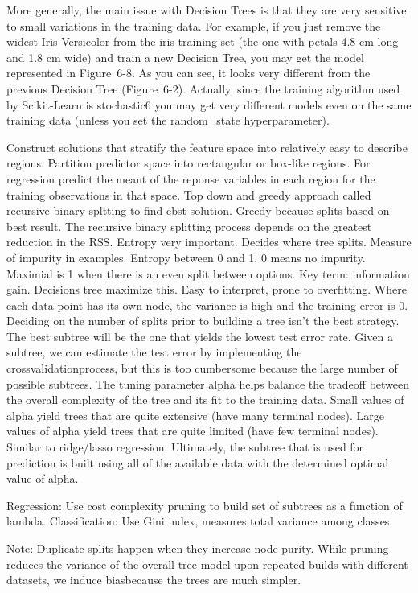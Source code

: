 \documentclass[]{book}
\begin{document}
More generally, the main issue with Decision Trees is that they are very sensitive to small variations in the training data. For example, if you just remove the widest Iris-Versicolor from the iris training set (the one with petals 4.8 cm long and 1.8 cm wide) and train a new Decision Tree, you may get the model represented in Figure~6-8. As you can see, it looks very different from the previous Decision Tree (Figure~6-2). Actually, since the training algorithm used by Scikit-Learn is stochastic6 you may get very different models even on the same training data (unless you set the random\_state hyperparameter).

Construct solutions that stratify the feature space into relatively easy to describe regions. Partition predictor space into rectangular or box-like regions. For regression predict the meant of the reponse variables in each region for the training observations in that space. Top down and greedy approach called recursive binary spltting to find ebst solution. Greedy because splits based on best result. The recursive binary splitting process depends on the greatest reduction in the RSS. Entropy very important. Decides where tree splits. Measure of impurity in examples. Entropy between 0 and 1. 0 means no impurity. Maximial is 1 when there is an even split between options. Key term: information gain. Decisions tree maximize this. Easy to interpret, prone to overfitting.
Where each data point has its own node, the variance is high and the training error is 0. Deciding on the number of splits prior to building a tree isn't the best strategy. The best subtree will be the one that yields the lowest test error rate. Given a subtree, we can estimate the test error by implementing the crossvalidationprocess, but this is too cumbersome because the large number of possible subtrees. The tuning parameter alpha helps balance the tradeoff between the overall complexity of the tree and its fit to the training data. Small values of alpha yield trees that are quite extensive (have many terminal nodes). Large values of alpha yield trees that are quite limited (have few terminal nodes). Similar to ridge/lasso regression. Ultimately, the subtree that is used for prediction is built using all of the available data with the determined optimal value of alpha.

Regression: Use cost complexity pruning to build set of subtrees as a function of lambda. Classification: Use Gini index, measures total variance among classes.

Note: Duplicate splits happen when they increase node purity. While pruning reduces the variance of the overall tree model upon repeated builds with different datasets, we induce biasbecause the trees are much simpler.
\end{document}
